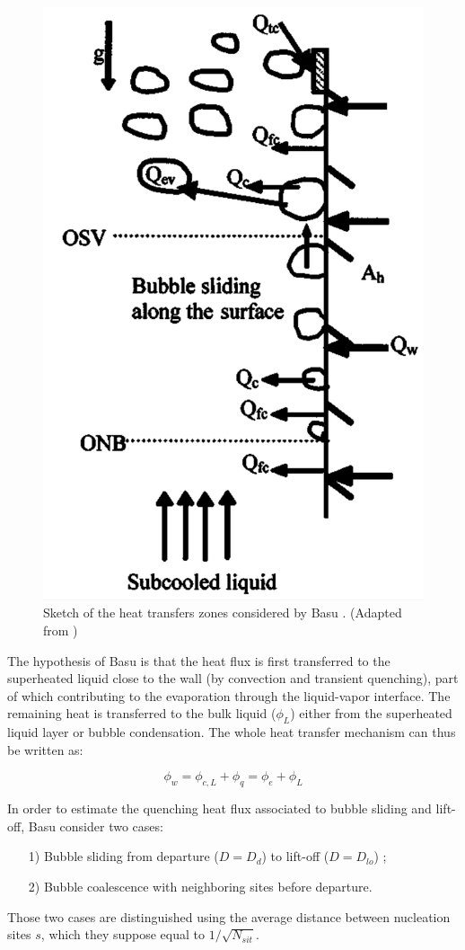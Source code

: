\begin{figure}[h]
\centering
\includegraphics[width=0.5\linewidth]{img/HFP/Basu/zones.PNG}
\caption{Sketch of the heat transfers zones considered by Basu \etal. (Adapted from \cite{Basu2005})}
\label{fig:Basu_zones}
\end{figure}
	

The hypothesis of Basu \etal is that the heat flux is first transferred to the superheated liquid close to the wall (by convection and transient quenching), part of which contributing to the evaporation through the liquid-vapor interface. The remaining heat is transferred to the bulk liquid ($\phi_{L}$) either from the superheated liquid layer or bubble condensation. The whole heat transfer mechanism can thus be written as:

\begin{equation}
\phi_{w} = \phi_{c,L}+\phi_{q} = \phi_{e} + \phi_{L}
\label{eq:HFP_B_tot}
\end{equation}

In order to estimate the quenching heat flux associated to bubble sliding and lift-off, Basu \etal consider two cases: 

\begin{itemize}
\item[1)] Bubble sliding from departure ($D=D_{d}$) to lift-off ($D=D_{lo}$) ;
\item[2)] Bubble coalescence with neighboring sites before departure.
\end{itemize} 

Those two cases are distinguished using the average distance between nucleation sites $s$, which they suppose equal to $1/\sqrt{N_{sit}}$.

